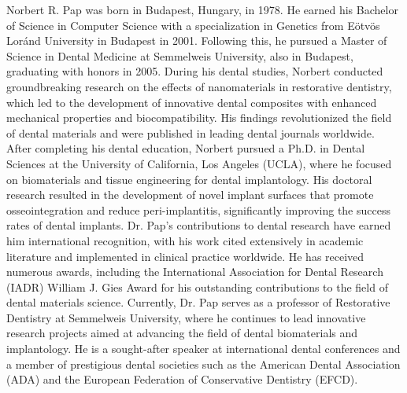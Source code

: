 \documentclass[journal,twoside,web]{ieeecolor}
\begin{document}
\begin{IEEEbiography}{Norbert R. Pap} was born in Budapest, Hungary, in 1978. He earned his Bachelor of Science in Computer Science with a specialization in Genetics from Eötvös Loránd University in Budapest in 2001. Following this, he pursued a Master of Science in Dental Medicine at Semmelweis University, also in Budapest, graduating with honors in 2005.
    During his dental studies, Norbert conducted groundbreaking research on the effects of nanomaterials in restorative dentistry, which led to the development of innovative dental composites with enhanced mechanical properties and biocompatibility. His findings revolutionized the field of dental materials and were published in leading dental journals worldwide.
    After completing his dental education, Norbert pursued a Ph.D. in Dental Sciences at the University of California, Los Angeles (UCLA), where he focused on biomaterials and tissue engineering for dental implantology. His doctoral research resulted in the development of novel implant surfaces that promote osseointegration and reduce peri-implantitis, significantly improving the success rates of dental implants.
    Dr. Pap's contributions to dental research have earned him international recognition, with his work cited extensively in academic literature and implemented in clinical practice worldwide. He has received numerous awards, including the International Association for Dental Research (IADR) William J. Gies Award for his outstanding contributions to the field of dental materials science.
    Currently, Dr. Pap serves as a professor of Restorative Dentistry at Semmelweis University, where he continues to lead innovative research projects aimed at advancing the field of dental biomaterials and implantology. He is a sought-after speaker at international dental conferences and a member of prestigious dental societies such as the American Dental Association (ADA) and the European Federation of Conservative Dentistry (EFCD).
\end{IEEEbiography}
\end{document}
